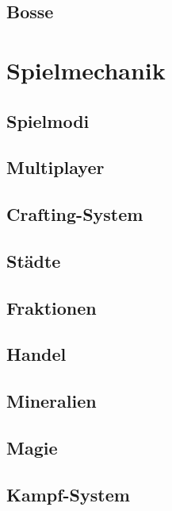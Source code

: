 \subsection{Bosse}
\label{subsec:bosse}

\section{Spielmechanik}
\label{sec:spielmechanik}

\subsection{Spielmodi}
\label{subsec:spielmodi}

\subsection{Multiplayer}
\label{subsec:multiplayer}

\subsection{Crafting-System}
\label{subsec:crafting}

\subsection{Städte}
\label{subsec:staedte}

\subsection{Fraktionen}
\label{subsec:Fraktionen}

\subsection{Handel}
\label{subsec:handel}

\subsection{Mineralien}
\label{subsec:mineralien}

\subsection{Magie}
\label{subsec:magie}

\subsection{Kampf-System}
\label{subsec:kamp-system}

